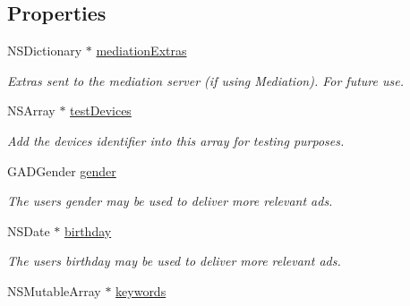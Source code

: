 \subsection*{Properties}
\begin{DoxyCompactItemize}
\item 
\mbox{\label{interfaceGADRequest_a0044440c757ab9d13e70190a95d6574c}} 
N\+S\+Dictionary $\ast$ \hyperlink{interfaceGADRequest_a0044440c757ab9d13e70190a95d6574c}{mediation\+Extras}
\begin{DoxyCompactList}\small\item\em Extras sent to the mediation server (if using Mediation). For future use. \end{DoxyCompactList}\item 
\mbox{\label{interfaceGADRequest_a0788559d9d879fb8b2f1df7599d67e66}} 
N\+S\+Array $\ast$ \hyperlink{interfaceGADRequest_a0788559d9d879fb8b2f1df7599d67e66}{test\+Devices}
\begin{DoxyCompactList}\small\item\em Add the device\textquotesingle{}s identifier into this array for testing purposes. \end{DoxyCompactList}\item 
\mbox{\label{interfaceGADRequest_a1c2a7e57eeeeab2c4ff3fc7ea186ba65}} 
G\+A\+D\+Gender \hyperlink{interfaceGADRequest_a1c2a7e57eeeeab2c4ff3fc7ea186ba65}{gender}
\begin{DoxyCompactList}\small\item\em The user\textquotesingle{}s gender may be used to deliver more relevant ads. \end{DoxyCompactList}\item 
\mbox{\label{interfaceGADRequest_a491aee87f3a04cb60a1b1634f99cebff}} 
N\+S\+Date $\ast$ \hyperlink{interfaceGADRequest_a491aee87f3a04cb60a1b1634f99cebff}{birthday}
\begin{DoxyCompactList}\small\item\em The user\textquotesingle{}s birthday may be used to deliver more relevant ads. \end{DoxyCompactList}\item 
N\+S\+Mutable\+Array $\ast$ \hyperlink{interfaceGADRequest_a804924c5fc3a5c4d46a7e12708dd0b2a}{keywords}
\end{DoxyCompactItemize}


